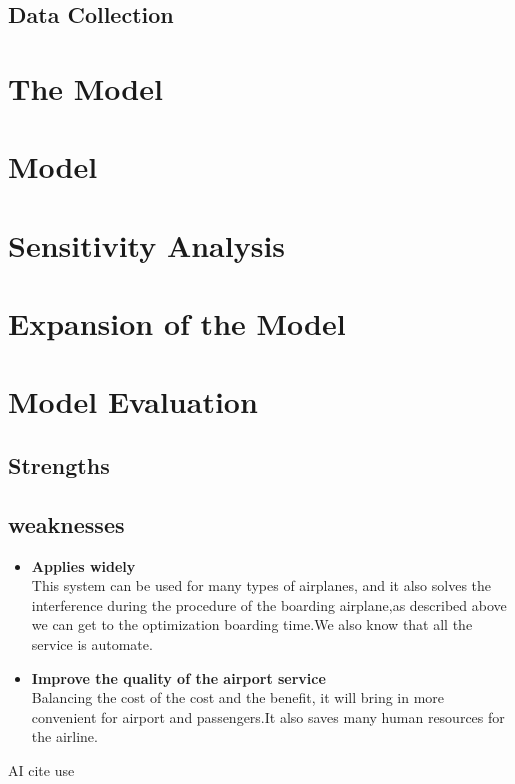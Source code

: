 \documentclass{mcmthesis}
\begin{document}
	\subsection{Data Collection}
	\section{The Model }
	\lipsum[6]
	\section{Model}
	\lipsum[9]
	\section{Sensitivity Analysis}
	\lipsum[6]
	\section{Expansion of the Model}
	\section{Model Evaluation}
	\subsection{Strengths}
	\lipsum[4]
	\subsection{weaknesses}
	\begin{itemize}
		\item \textbf{Applies widely}\\
		This  system can be used for many types of airplanes, and it also
		solves the interference during  the procedure of the boarding
		airplane,as described above we can get to the  optimization
		boarding time.We also know that all the service is automate.
		\item \textbf{Improve the quality of the airport service}\\
		Balancing the cost of the cost and the benefit, it will bring in
		more convenient  for airport and passengers.It also saves many
		human resources for the airline.
	\end{itemize}
	
	AI cite use 
	
\end{document}
